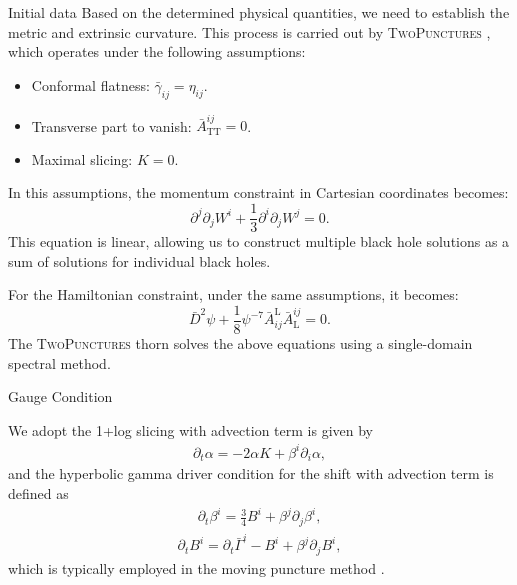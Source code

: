 \documentclass[noamssymb]{beamer}
\newlength{\colwidth}
\begin{document}
\begin{frame}[t]
\begin{columns}[t]
\begin{column}{\colwidth}
\begin{block}{Initial data}
  	Based on the determined physical quantities, we need to establish the metric and extrinsic curvature. This process is carried out by \textsc{TwoPunctures} \cite{Ansorg:2004ds}, which operates under the following assumptions:
  	\begin{itemize}
  		\item Conformal flatness: $\bar{\gamma}_{ij} = \eta_{ij}$.
  		\item Transverse part to vanish: $\bar{A}_\mathrm{TT}^{ij} = 0$.
  		\item Maximal slicing: $K=0$.
  	\end{itemize}
  	In this assumptions, the momentum constraint in Cartesian coordinates becomes:
  	\begin{equation}
  		\partial^j \partial_j W^i + \frac{1}{3}\partial^i\partial_j W^j = 0.
  	\end{equation}
  	This equation is linear, allowing us to construct multiple black hole solutions as a sum of solutions for individual black holes.
  	
  	For the Hamiltonian constraint, under the same assumptions, it becomes:
  	\begin{equation}
  		\bar{D}^2\psi + \frac{1}{8}\psi^{-7}\bar{A}^\mathrm{L}_{ij}\bar{A}^{ij}_\mathrm{L} = 0.
  	\end{equation}
  	The \textsc{TwoPunctures} thorn solves the above equations using a single-domain spectral method.
  	
  	
  \end{block}

  \begin{block}{Gauge Condition}

    We adopt the 1+log slicing with advection term is given by
    \begin{eqnarray}
    	\label{eq:logadv}
    	\partial_t \alpha = -2\alpha K + \beta^i \partial_i \alpha,
    \end{eqnarray}
    and the hyperbolic gamma driver condition for the shift with advection term is defined as
    \begin{eqnarray}
    	\label{eq:betaadv}
    	\partial_t \beta^i = \frac{3}{4}B^i + \beta^j\partial_j \beta^i,
    \end{eqnarray}
    \begin{eqnarray}
    	\label{eq:Badv}
    	\partial_t B^i = \partial_t \bar{\Gamma}^i -B^i + \beta^j \partial_j B^i,
    \end{eqnarray}
    which is typically employed in the moving puncture method \cite{Campanelli:2005dd, Alcubierre:2002kk}. 
    

\end{block}
\end{column}
\end{columns}
\end{frame}
\end{document}
